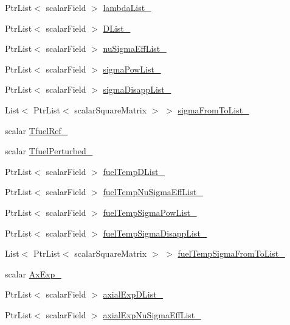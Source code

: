 \begin{DoxyCompactItemize}
\item 
Ptr\+List$<$ scalar\+Field $>$ \hyperlink{classFoam_1_1XS_a37af06cda2ab5af98b94777e4798a67d}{lambda\+List\+\_\+}
\item 
Ptr\+List$<$ scalar\+Field $>$ \hyperlink{classFoam_1_1XS_a75affe491d72f7c8f8bfee9646944e7c}{D\+List\+\_\+}
\item 
Ptr\+List$<$ scalar\+Field $>$ \hyperlink{classFoam_1_1XS_a5ef650c5f31d9ce711fa23fd0e41aa25}{nu\+Sigma\+Eff\+List\+\_\+}
\item 
Ptr\+List$<$ scalar\+Field $>$ \hyperlink{classFoam_1_1XS_aca36c81fd45ba2181ad6fd4909e23c22}{sigma\+Pow\+List\+\_\+}
\item 
Ptr\+List$<$ scalar\+Field $>$ \hyperlink{classFoam_1_1XS_a274ed8e7933c604c11f62cf24f2e2235}{sigma\+Disapp\+List\+\_\+}
\item 
List$<$ Ptr\+List$<$ scalar\+Square\+Matrix $>$ $>$ \hyperlink{classFoam_1_1XS_abee7c68a33baa5d80b71d09034eb2b8e}{sigma\+From\+To\+List\+\_\+}
\item 
scalar \hyperlink{classFoam_1_1XS_afb9aa7be3330545222d1b55f9c11a305}{Tfuel\+Ref\+\_\+}
\item 
scalar \hyperlink{classFoam_1_1XS_a0dc5e6d6ef7dce5ab4285edb38ce1950}{Tfuel\+Perturbed\+\_\+}
\item 
Ptr\+List$<$ scalar\+Field $>$ \hyperlink{classFoam_1_1XS_a89df9893e9de8311c3d836074cebe392}{fuel\+Temp\+D\+List\+\_\+}
\item 
Ptr\+List$<$ scalar\+Field $>$ \hyperlink{classFoam_1_1XS_a2930058a326b118fe694a0794ae99c29}{fuel\+Temp\+Nu\+Sigma\+Eff\+List\+\_\+}
\item 
Ptr\+List$<$ scalar\+Field $>$ \hyperlink{classFoam_1_1XS_a714482ef732352d0a87e42fbca21cdbc}{fuel\+Temp\+Sigma\+Pow\+List\+\_\+}
\item 
Ptr\+List$<$ scalar\+Field $>$ \hyperlink{classFoam_1_1XS_adb55e4fd3a655717d7919018ee32045c}{fuel\+Temp\+Sigma\+Disapp\+List\+\_\+}
\item 
List$<$ Ptr\+List$<$ scalar\+Square\+Matrix $>$ $>$ \hyperlink{classFoam_1_1XS_a0250fdac7dd6025d57959c7c46b2eefa}{fuel\+Temp\+Sigma\+From\+To\+List\+\_\+}
\item 
scalar \hyperlink{classFoam_1_1XS_a6c7284f6579cd88a4f1e8e2abebcd9e9}{Ax\+Exp\+\_\+}
\item 
Ptr\+List$<$ scalar\+Field $>$ \hyperlink{classFoam_1_1XS_a349cde89aa9862e228baf7c3be7cc03e}{axial\+Exp\+D\+List\+\_\+}
\item 
Ptr\+List$<$ scalar\+Field $>$ \hyperlink{classFoam_1_1XS_a7e2217620eb3984c160751e54bf3d15f}{axial\+Exp\+Nu\+Sigma\+Eff\+List\+\_\+}

\end{DoxyCompactItemize}
